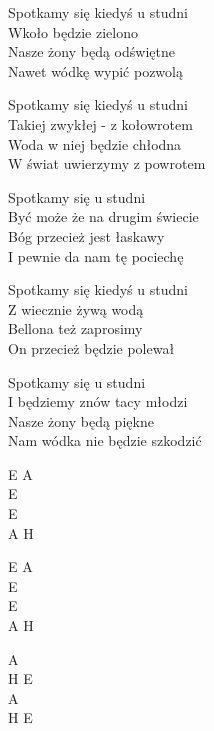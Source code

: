 \begin{text}
	Spotkamy się kiedyś u studni\\
	Wkoło będzie zielono\\
	Nasze żony będą odświętne\\
	Nawet wódkę wypić pozwolą

	Spotkamy się kiedyś u studni\\
	Takiej zwykłej - z kołowrotem\\
	Woda w niej będzie chłodna\\
	W świat uwierzymy z powrotem

	Spotkamy się u studni\\
	Być może że na drugim świecie\\
	Bóg przecież jest łaskawy\\
	I pewnie da nam tę pociechę

	Spotkamy się kiedyś u studni\\
	Z wiecznie żywą wodą\\
	Bellona też zaprosimy\\
	On przecież będzie polewał

	Spotkamy się u studni\\
	I będziemy znów tacy młodzi\\
	Nasze żony będą piękne\\
	Nam wódka nie będzie szkodzić
\end{text}
\begin{chord}
E A\\
E\\
E\\
A H

E A\\
E\\
E\\
A H

A\\
H E\\
A\\
H E
\end{chord}
